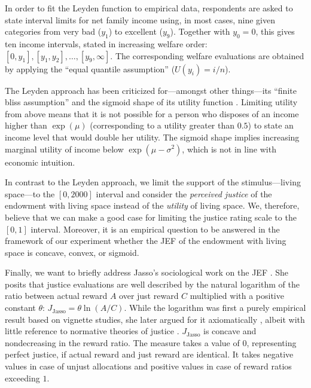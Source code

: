 \documentclass[12pt]{scrartcl}
\begin{document}
In order to fit the Leyden function to empirical data, respondents are asked to state interval limits for net family income using, in most cases, nine given categories from very bad ($y_1$) to excellent ($y_9$).
Together with $y_0=0$, this gives ten income intervals, stated in increasing welfare order: $[0,y_1],[y_1,y_2],\ldots,[y_9,\infty]$.
The corresponding welfare evaluations are obtained by applying the ``equal quantile assumption'' ($U(y_i)=i/n$).

The Leyden approach has been criticized for---amongst other things---its ``finite bliss assumption'' and the sigmoid shape of its utility function \citep{seidl_how_1994}.
Limiting utility from above means that it is not possible for a person who disposes of an income higher than $\exp(\mu)$ (corresponding to a utility greater than $0.5$) to state an income level that would double her utility.
The sigmoid shape implies increasing marginal utility of income below $\exp(\mu-\sigma^2)$, which is not in line with economic intuition.

In contrast to the Leyden approach, we limit the support of the stimulus---living space---to the $[0,2000]$ interval and consider the \textit{perceived justice} of the endowment with living space instead of the \textit{utility} of living space.
We, therefore, believe that we can make a good case for limiting the justice rating scale to the $[0,1]$ interval.
Moreover, it is an empirical question to be answered in the framework of our experiment whether the JEF of the endowment with living space is concave, convex, or sigmoid.

Finally, we want to briefly address Jasso's sociological work on the JEF \citep[e.\,g.,][]{jasso_justice_1978,jasso_methods_1990}.
She posits that justice evaluations are well described by the natural logarithm of the ratio between actual reward $A$ over just reward $C$ multiplied with a positive constant $\theta$: $J_\text{Jasso}=\theta\ln(A/C)$.
While the logarithm was first a purely empirical result based on vignette studies, she later argued for it axiomatically \citep{jasso_methods_1990}, albeit with little reference to normative theories of justice \citep[but also see, e.\,g.,][]{jasso_is_2020}.
$J_\text{Jasso}$ is concave and nondecreasing in the reward ratio.
The measure takes a value of $0$, representing perfect justice, if actual reward and just reward are identical.
It takes negative values in case of unjust allocations and positive values in case of reward ratios exceeding $1$.
\end{document}
